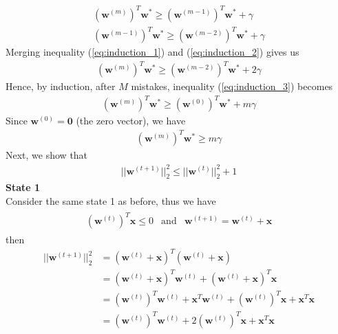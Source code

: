 \begin{align}
  \label{eq:induction_1}
  (\textbf{w}^ {(m)})^T\textbf{w}^{*} \geq (\textbf{w}^ {(m-1)})^T\textbf{w}^{*} + \gamma \\
  \label{eq:induction_2}
  (\textbf{w}^ {(m-1)})^T\textbf{w}^{*} \geq (\textbf{w}^ {(m-2)})^T\textbf{w}^{*} + \gamma 
\end{align}
Merging inequality (\ref{eq:induction_1}) and (\ref{eq:induction_2}) gives us
\begin{align}
  \label{eq:induction_3}
  (\textbf{w}^ {(m)})^T\textbf{w}^{*} \geq (\textbf{w}^ {(m-2)})^T\textbf{w}^{*} + 2\gamma
\end{align}
Hence, by induction, after $M$ mistakes, inequality (\ref{eq:induction_3}) becomes
\begin{align}
  \label{eq:induction_starts}
  (\textbf{w}^ {(m)})^T\textbf{w}^{*} \geq (\textbf{w}^ {(0)})^T\textbf{w}^{*} + m\gamma
\end{align}
Since $\textbf{w}^{(0)} = \mathbf{0}$ (the zero vector), we have
\begin{align}
  \label{eq:perp_cov_result1}
  (\textbf{w}^ {(m)})^T\textbf{w}^{*} \geq m\gamma
\end{align}
Next, we show that 
\begin{align}
  ||{\textbf{w}^{(t+1)}}||_{2}^{2} \leq ||{\textbf{w}^{(t)}}||_{2}^{2} + 1
  \label{eq:induction_proof_part2}
\end{align}
\indent \textbf{State 1} \\
Consider the same state 1 as before, thus we have
\begin{align}
  \begin{matrix}
    \label{eq:state1_conditions}
    (\textbf{w}^ {(t)})^T\textbf{x} \leq 0 & \text{and} & \textbf{w}^ {(t+1)} = \textbf{w}^{(t)} + \textbf{x}
  \end{matrix}
\end{align}
then
\begin{align}
  \nonumber
  ||\textbf{w}^{(t+1)}||_{2}^{2} &= ( \textbf{w}^{(t)} + \textbf{x})^T( \textbf{w}^{(t)} + \textbf{x}) \\
  \nonumber
  &=( \textbf{w}^{(t)} + \textbf{x})^T\textbf{w}^{(t)} + ( \textbf{w}^{(t)} + \textbf{x})^T\textbf{x} \\
  \nonumber
  &= (\textbf{w}^{(t)})^T\textbf{w}^{(t)} + \textbf{x}^T\textbf{w}^{(t)} + (\textbf{w}^{(t)})^T\textbf{x} + \textbf{x}^T\textbf{x}\\
  &= (\textbf{w}^{(t)})^T\textbf{w}^{(t)} + 2 (\textbf{w}^{(t)})^T\textbf{x}  + \textbf{x}^T\textbf{x}
  \label{eq:state_1_proof}
\end{align}
